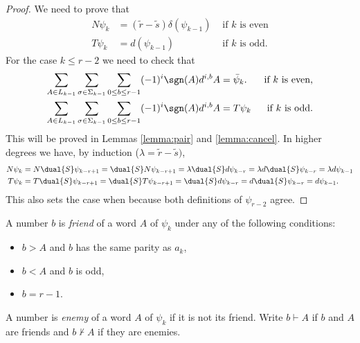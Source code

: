 \begin{proof}
	We need to prove that
	\begin{align*}
		N\psi_{k} & = (\tilde{r}-\tilde{s})\delta(\psi_{k-1}) & \text{ if $k$ is even} \\
		T\psi_{k} &= d(\psi_{k-1}) & \text{ if $k$ is odd.}
	\end{align*}
	For the case $k\leq r-2$ we need to check that
	\begin{align*}
		\sum_{A\in L_{k-1}}\sum_{\sigma\in \Sigma_{k-1}}\sum_{0\leq b\leq r-1}(-1)^i\sgn(A)d^{i,b}A &= \bar{\psi}_k. & \text{ if $k$ is even,}\\
		\sum_{A\in L_{k-1}}\sum_{\sigma\in \Sigma_{k-1}}\sum_{0\leq b\leq r-1}(-1)^i\sgn(A)d^{i,b}A &= T\psi_k & \text{if $k$ is odd.}
	\end{align*}
	This will be proved in Lemmas \ref{lemma:pair} and \ref{lemma:cancel}. In higher degrees we have, by induction ($\lambda = \tilde{r}-\tilde{s})$,
	\begin{align*}
		N\psi_{k} &= N\dual{S}\psi_{k-r+1} = \dual{S} N\psi_{k-r+1} = \lambda\dual{S} d\psi_{k-r} = \lambda d\dual{S} \psi_{k-r} = \lambda d\psi_{k-1}\\
		T\psi_{k} &= T\dual{S}\psi_{k-r+1} = \dual{S} T\psi_{k-r+1} = \dual{S} d\psi_{k-r} = d\dual{S} \psi_{k-r} = d\psi_{k-1}.
	\end{align*}
	This also sets the case when because both definitions of $\psi_{r-2}$ agree.
\end{proof}




A number $b$ is \emph{friend} of a word $A$ of $\psi_k$ under any of the following conditions:
\begin{itemize}
	\item $b>A$ and $b$ has the same parity as $a_{k}$,
	\item $b<A$ and $b$ is odd,
	\item $b=r-1$.
\end{itemize}
A number is \emph{enemy} of a word $A$ of $\psi_k$ if it is not its friend. Write $b\vdash A$ if $b$ and $A$ are friends and $b\not\vdash A$ if they are enemies.

